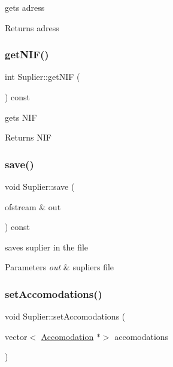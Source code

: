 gets adress 

\begin{DoxyReturn}{Returns}
adress 
\end{DoxyReturn}
\hypertarget{class_suplier_ae200d0fc598080361dccfc947dd071c5}{}\label{class_suplier_ae200d0fc598080361dccfc947dd071c5} 
\subsubsection{\texorpdfstring{get\+N\+I\+F()}{getNIF()}}
{\footnotesize\ttfamily int Suplier\+::get\+N\+IF (\begin{DoxyParamCaption}{ }\end{DoxyParamCaption}) const\hspace{0.3cm}{\ttfamily [inline]}}



gets N\+IF 

\begin{DoxyReturn}{Returns}
N\+IF 
\end{DoxyReturn}
\hypertarget{class_suplier_a91fbf47980aa9c9f3e55d9fcc0320201}{}\label{class_suplier_a91fbf47980aa9c9f3e55d9fcc0320201} 
\subsubsection{\texorpdfstring{save()}{save()}}
{\footnotesize\ttfamily void Suplier\+::save (\begin{DoxyParamCaption}\item[{ofstream \&}]{out }\end{DoxyParamCaption}) const}



saves suplier in the file 


\begin{DoxyParams}{Parameters}
{\em out} & supliers file \\
\hline
\end{DoxyParams}
\hypertarget{class_suplier_a9b99e7cbd4cb78a97cad39ffd6d0a691}{}\label{class_suplier_a9b99e7cbd4cb78a97cad39ffd6d0a691} 
\subsubsection{\texorpdfstring{set\+Accomodations()}{setAccomodations()}}
{\footnotesize\ttfamily void Suplier\+::set\+Accomodations (\begin{DoxyParamCaption}\item[{vector$<$ \hyperlink{class_accomodation}{Accomodation} $\ast$$>$}]{accomodations }\end{DoxyParamCaption})\hspace{0.3cm}{\ttfamily [inline]}}



